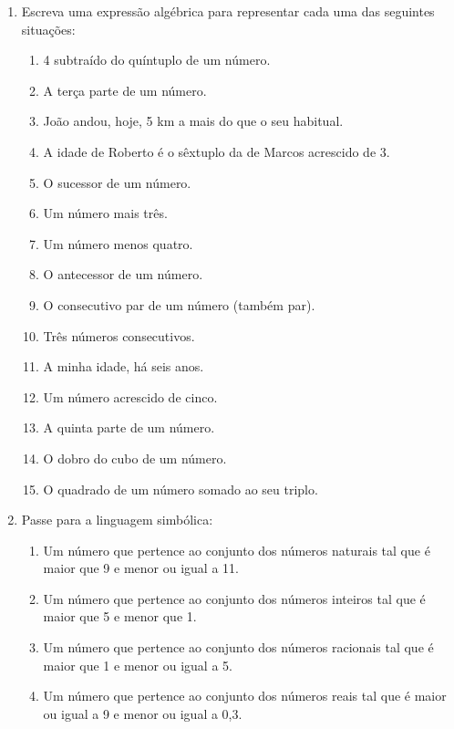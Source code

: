 \begin{enumerate}
 \item Escreva uma expressão algébrica para representar cada uma das seguintes situações:
 \begin{enumerate} 
   \item  4 subtraído do quíntuplo de um número.
   \vskip 0.5cm
   \item  A terça parte de um número.
   \vskip 0.5cm
   \item  João andou, hoje, 5 km a mais do que o seu habitual.
   \vskip 0.5cm
   \item  A idade de Roberto é o sêxtuplo da de Marcos acrescido de 3.
   \vskip 0.5cm
   \item  O sucessor de um número.
   \vskip 0.5cm
   \item  Um número mais três.
   \vskip 0.5cm
   \item  Um número menos quatro.
   \vskip 0.5cm
   \item  O antecessor de um número.
   \vskip 0.5cm
   \item  O consecutivo par de um número (também par).
   \vskip 0.5cm
   \item  Três números consecutivos.
   \vskip 0.5cm
   \item  A minha idade, há seis anos.
   \vskip 0.5cm
   \item  Um número acrescido de cinco.
   \vskip 0.5cm
   \item  A quinta parte de um número.
   \vskip 0.5cm
   \item  O dobro do cubo de um número.
   \vskip 0.5cm
   \item  O quadrado de um número somado ao seu triplo.
   \vskip 0.5cm
 \end{enumerate}
 
 \item Passe para a linguagem simbólica:
  \begin{enumerate} 
  \item Um número que pertence ao conjunto dos números naturais tal que é maior que 9 e menor ou igual a 11.
  \vskip 0.5cm
  \item Um número que pertence ao conjunto dos números inteiros tal que é maior que ­5 e menor que 1.
  \vskip 0.5cm
  \item Um número que pertence ao conjunto dos números racionais tal que é maior que ­1 e menor ou igual a 5.
  \vskip 0.5cm
  \item Um número que pertence ao conjunto dos números reais tal que é maior ou igual a ­9 e menor ou igual a 0,3.
  \vskip 0.5cm
  \end{enumerate}
  

\end{enumerate}
